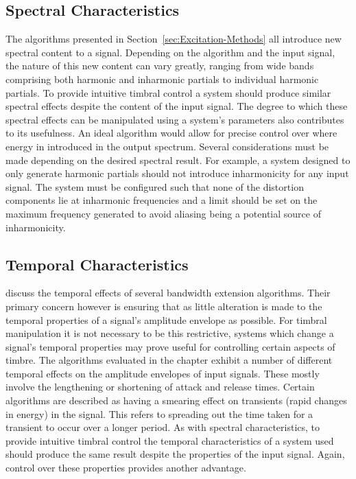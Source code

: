 	\subsection{Spectral Characteristics}
	\label{sec:ExcitationEvaluation-Evaluation-SpectralCharacteristics}
		The algorithms presented in Section~\ref{sec:Excitation-Methods} all introduce new spectral content to a
		signal. Depending on the algorithm and the input signal, the nature of this new content can vary greatly,
		ranging from wide bands comprising both harmonic and inharmonic partials to individual harmonic partials.
		To provide intuitive timbral control a system should produce similar spectral effects despite the content
		of the input signal. The degree to which these spectral effects can be manipulated using a system's
		parameters also contributes to its usefulness. An ideal algorithm would allow for precise control over
		where energy in introduced in the output spectrum. Several considerations must be made depending on the
		desired spectral result. For example, a system designed to only generate harmonic partials should not
		introduce inharmonicity for any input signal. The system must be configured such that none of the
		distortion components lie at inharmonic frequencies and a limit should be set on the maximum frequency
		generated to avoid aliasing being a potential source of inharmonicity.

	\subsection{Temporal Characteristics}
	\label{sec:ExcitationEvaluation-Evaluation-TemporalCharacteristics}		
		\citet{larsen2004audio} discuss the temporal effects of several bandwidth extension algorithms. Their
		primary concern however is ensuring that as little alteration is made to the temporal properties of a
		signal's amplitude envelope as possible. For timbral manipulation it is not necessary to be this
		restrictive, systems which change a signal's temporal properties may prove useful for controlling certain
		aspects of timbre. The algorithms evaluated in the chapter exhibit a number of different temporal effects
		on the amplitude envelopes of input signals. These mostly involve the lengthening or shortening of attack
		and release times.  Certain algorithms are described as having a smearing effect on transients (rapid
		changes in energy) in the signal. This refers to spreading out the time taken for a transient to occur over
		a longer period. As with spectral characteristics, to provide intuitive timbral control the temporal
		characteristics of a system used should produce the same result despite the properties of the input signal.
		Again, control over these properties provides another advantage.

